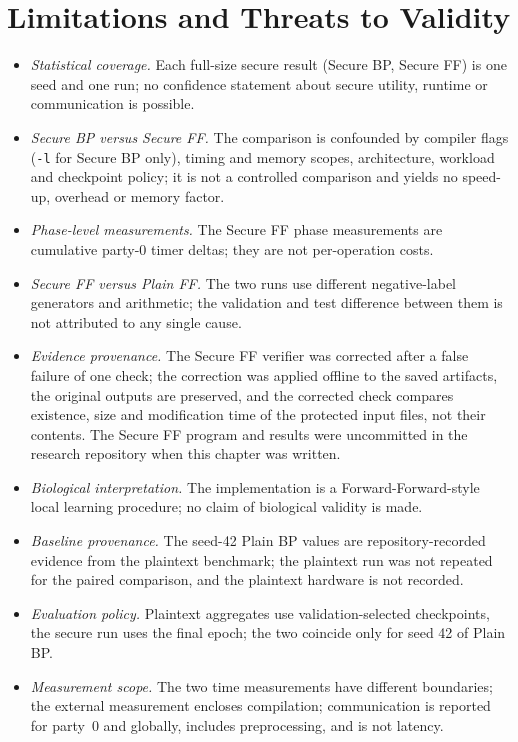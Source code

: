 \section{Limitations and Threats to Validity}\label{sec:disc-limits}
\begin{itemize}
  \item \emph{Statistical coverage.} Each full-size secure result (Secure BP, Secure FF) is one seed and one run; no confidence statement about secure utility, runtime or communication is possible.
  \item \emph{Secure BP versus Secure FF.} The comparison is confounded by compiler flags (\texttt{-l} for Secure BP only), timing and memory scopes, architecture, workload and checkpoint policy; it is not a controlled comparison and yields no speed-up, overhead or memory factor.
  \item \emph{Phase-level measurements.} The Secure FF phase measurements are cumulative party-0 timer deltas; they are not per-operation costs.
  \item \emph{Secure FF versus Plain FF.} The two runs use different negative-label generators and arithmetic; the validation and test difference between them is not attributed to any single cause.
  \item \emph{Evidence provenance.} The Secure FF verifier was corrected after a false failure of one check; the correction was applied offline to the saved artifacts, the original outputs are preserved, and the corrected check compares existence, size and modification time of the protected input files, not their contents. The Secure FF program and results were uncommitted in the research repository when this chapter was written.
  \item \emph{Biological interpretation.} The implementation is a Forward-Forward-style local learning procedure; no claim of biological validity is made.
  \item \emph{Baseline provenance.} The seed-42 Plain BP values are repository-recorded evidence from the plaintext benchmark; the plaintext run was not repeated for the paired comparison, and the plaintext hardware is not recorded.
  \item \emph{Evaluation policy.} Plaintext aggregates use validation-selected checkpoints, the secure run uses the final epoch; the two coincide only for seed 42 of Plain BP.
  \item \emph{Measurement scope.} The two time measurements have different boundaries; the external measurement encloses compilation; communication is reported for party~0 and globally, includes preprocessing, and is not latency.

\end{itemize}
